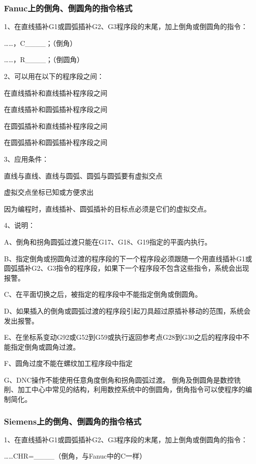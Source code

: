 \subsubsection{Fanuc上的倒角、倒圆角的指令格式}
	
1、在直线插补G1或圆弧插补G2、G3程序段的末尾，加上倒角或倒圆角的指令：

……，C\_\_\_\_；（倒角）

……，R\_\_\_\_；（倒圆角）

2、可以用在以下的程序段之间：

在直线插补和直线插补程序段之间

在直线插补和圆弧插补程序段之间

在圆弧插补和直线插补程序段之间

在圆弧插补和圆弧插补程序段之间

3、应用条件：

直线与直线、直线与圆弧、圆弧与圆弧要有虚拟交点

虚拟交点坐标已知或方便求出

因为编程时，直线插补、圆弧插补的目标点必须是它们的虚拟交点。

4、说明：

A、倒角和拐角圆弧过渡只能在G17、G18、G19指定的平面内执行。

B、指定倒角或拐圆角过渡的程序段的下一个程序段必须跟随一个用直线插补G1或圆弧插补G2、G3指令的程序段，如果下一个程序段不包含这些指令，系统会出现报警。

C、在平面切换之后，被指定的程序段中不能指定倒角或倒圆角。

D、如果插入的倒角或圆弧过渡的程序段引起刀具超过原插补移动的范围，系统会发出报警。

E、在坐标系变动G92或G52到G59或执行返回参考点G28到G30之后的程序段中不能指定倒角或圆角过渡。

F、圆角过度不能在螺纹加工程序段中指定

G、DNC操作不能使用任意角度倒角和拐角圆弧过渡。
倒角及倒圆角是数控铣削、加工中心中常见的结构，利用数控系统中的倒圆角，倒角指令可以使程序的编制简化。
	
	
	
	
	
	


\subsubsection{Siemens上的倒角、倒圆角的指令格式}
	1、在直线插补G1或圆弧插补G2、G3程序段的末尾，加上倒角或倒圆角的指令：
	
	……CHR=\_\_\_\_（倒角，与Fanuc中的C一样）
	

